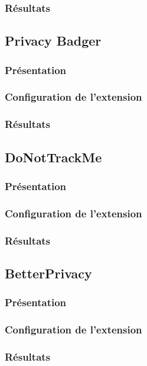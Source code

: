 \subsubsection{Résultats}

\subsection{Privacy Badger}
\subsubsection{Présentation}
\subsubsection{Configuration de l'extension}
\subsubsection{Résultats}

\subsection{DoNotTrackMe}
\subsubsection{Présentation}
\subsubsection{Configuration de l'extension}
\subsubsection{Résultats}

\subsection{BetterPrivacy}
\subsubsection{Présentation}
\subsubsection{Configuration de l'extension}
\subsubsection{Résultats}

